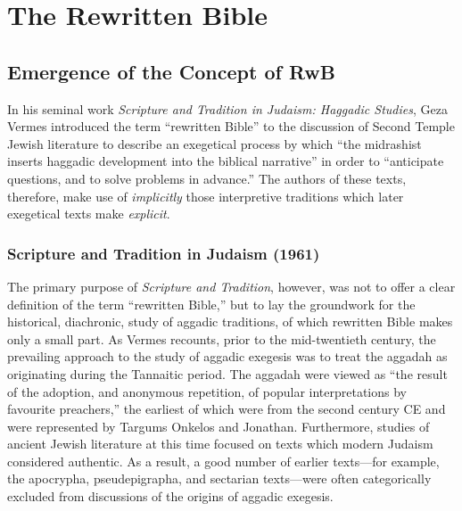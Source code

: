 \chapter{The Rewritten Bible}\label{the-rwb}

\section{Emergence of the Concept of
RwB}\label{emergence-of-the-concept-of-rwb}

In his seminal work
\emph{Scripture and Tradition in Judaism: Haggadic Studies}, Geza Vermes
introduced the term ``rewritten Bible'' to the discussion of Second
Temple Jewish literature to describe an exegetical process by which
``the midrashist inserts haggadic development into the biblical
narrative'' in order to ``anticipate questions, and to solve problems in
advance.''\autocites[95]{vermes1961}[see also][]{vermes_zsengeller2014}
The authors of these texts, therefore, make use of \emph{implicitly}
those interpretive traditions which later exegetical texts make
\emph{explicit}.

\subsection{Scripture and Tradition in Judaism
(1961)}\label{scripture-and-tradition-in-judaism-1961}

The primary purpose of \emph{Scripture and Tradition}, however, was not
to offer a clear definition of the term ``rewritten Bible,'' but to lay
the groundwork for the historical, diachronic, study of aggadic
traditions, of which rewritten Bible makes only a small
part.\autocite[3]{vermes_zsengeller2014} As Vermes recounts, prior to
the mid-twentieth century, the prevailing approach to the study of
aggadic exegesis was to treat the aggadah as originating during the
Tannaitic period. The aggadah were viewed as ``the result of the
adoption, and anonymous repetition, of popular interpretations by
favourite preachers,'' \autocite[3]{vermes1961} the earliest of which
were from the second century CE and were represented by Targums Onkelos
and Jonathan. Furthermore, studies of ancient Jewish literature at this
time focused on texts which modern Judaism considered authentic. As a
result, a good number of earlier texts---for example, the apocrypha,
pseudepigrapha, and sectarian texts---were often categorically excluded
from discussions of the origins of aggadic
exegesis.\autocite[2]{vermes1961}

